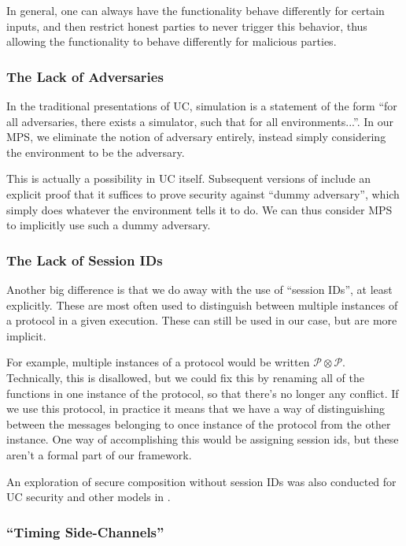 In general, one can always have the functionality
behave differently for certain inputs,
and then restrict honest parties to never trigger this behavior,
thus allowing the functionality to behave differently
for malicious parties.

\subsubsection*{The Lack of Adversaries}

In the traditional presentations of UC,
simulation is a statement of the form ``for all adversaries,
there exists a simulator, such that for all environments...''.
In our MPS, we eliminate the notion of adversary
entirely, instead simply considering the environment
to be the adversary.

This is actually a possibility in UC itself.
Subsequent versions of \cite{EPRINT:Canetti00} include
an explicit proof that it suffices to prove security against ``dummy adversary'',
which simply does whatever the environment tells it to do.
We can thus consider MPS to implicitly use such a dummy adversary.

\subsubsection*{The Lack of Session IDs}

Another big difference is that we do away with the use of ``session IDs'',
at least explicitly.
These are most often used to distinguish between multiple
instances of a protocol in a given execution.
These can still be used in our case, but are more implicit.

For example, multiple instances of a protocol would be written
$\mathscr{P} \otimes \mathscr{P}$.
Technically, this is disallowed, but we could fix this
by renaming all of the functions in one instance of the protocol,
so that there's no longer any conflict.
If we use this protocol, in practice it means that we
have a way of distinguishing between the messages belonging
to once instance of the protocol from the other instance.
One way of accomplishing this would be assigning session ids,
but these aren't a formal part of our framework.

An exploration of secure composition without session IDs
was also conducted for UC security and other models
in \cite{CCS:KusTue11}.

\subsubsection*{``Timing Side-Channels''}

